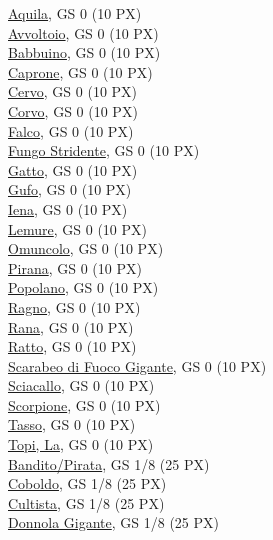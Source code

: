 \begin{multicols}{3}
{\small
\noindent\hyperlink{Aquila}{Aquila}, GS 0 (10 PX)\\
\hyperlink{Avvoltoio}{Avvoltoio}, GS 0 (10 PX)\\
\hyperlink{Babbuino}{Babbuino}, GS 0 (10 PX)\\
\hyperlink{Caprone}{Caprone}, GS 0 (10 PX)\\
\hyperlink{Cervo}{Cervo}, GS 0 (10 PX)\\
\hyperlink{Corvo}{Corvo}, GS 0 (10 PX)\\
\hyperlink{Falco}{Falco}, GS 0 (10 PX)\\
\hyperlink{Fungo Stridente}{Fungo Stridente}, GS 0 (10 PX)\\
\hyperlink{Gatto}{Gatto}, GS 0 (10 PX)\\
\hyperlink{Gufo}{Gufo}, GS 0 (10 PX)\\
\hyperlink{Iena}{Iena}, GS 0 (10 PX)\\
\hyperlink{Lemure}{Lemure}, GS 0 (10 PX)\\
\hyperlink{Omuncolo}{Omuncolo}, GS 0 (10 PX)\\
\hyperlink{Pirana}{Pirana}, GS 0 (10 PX)\\
\hyperlink{Popolano}{Popolano}, GS 0 (10 PX)\\
\hyperlink{Ragno}{Ragno}, GS 0 (10 PX)\\
\hyperlink{Rana}{Rana}, GS 0 (10 PX)\\
\hyperlink{Ratto}{Ratto}, GS 0 (10 PX)\\
\hyperlink{Scarabeo di Fuoco Gigante}{Scarabeo di Fuoco Gigante}, GS 0 (10 PX)\\
\hyperlink{Sciacallo}{Sciacallo}, GS 0 (10 PX)\\
\hyperlink{Scorpione}{Scorpione}, GS 0 (10 PX)\\
\hyperlink{Tasso}{Tasso}, GS 0 (10 PX)\\
\hyperlink{Topi, La}{Topi, La}, GS 0 (10 PX)\\
\hyperlink{Bandito/Pirata}{Bandito/Pirata}, GS 1/8 (25 PX)\\
\hyperlink{Coboldo}{Coboldo}, GS 1/8 (25 PX)\\
\hyperlink{Cultista}{Cultista}, GS 1/8 (25 PX)\\
\hyperlink{Donnola Gigante}{Donnola Gigante}, GS 1/8 (25 PX)\\
}
\end{multicols}
